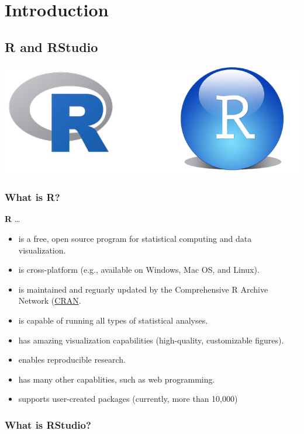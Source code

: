 \documentclass[]{book}
\providecommand{\tightlist}{%
  \setlength{\itemsep}{0pt}\setlength{\parskip}{0pt}}
\begin{document}
\hypertarget{part1}{%
\chapter{Introduction}\label{part1}}

\hypertarget{r-and-rstudio}{%
\section{R and RStudio}\label{r-and-rstudio}}

\includegraphics{figure/r_and_rstudio.png}

\hypertarget{what-is-r}{%
\subsection{\texorpdfstring{What is \textbf{R}?}{What is R?}}\label{what-is-r}}

\textbf{R} \ldots{}

\begin{itemize}
\tightlist
\item
  is a free, open source program for statistical computing and data visualization.
\item
  is cross-platform (e.g., available on Windows, Mac OS, and Linux).
\item
  is maintained and reguarly updated by the Comprehensive R Archive Network (\href{https://cran.r-project.org/}{CRAN}.
\item
  is capable of running all types of statistical analyses.
\item
  has amazing visualization capabilities (high-quality, customizable figures).
\item
  enables reproducible research.
\item
  has many other capablities, such as web programming.
\item
  supports user-created packages (currently, more than 10,000)
\end{itemize}

\hypertarget{what-is-rstudio}{%
\subsection{What is RStudio?}\label{what-is-rstudio}}
\end{document}

